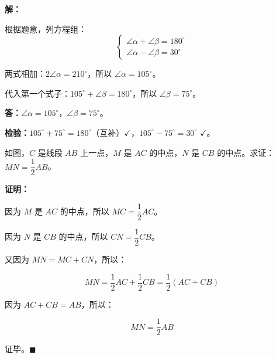 \documentclass[12pt, a4paper]{ctexart}
\begin{document}
\textbf{解：}

根据题意，列方程组：
$$\begin{cases} \angle\alpha+\angle\beta=180^\circ \\ \angle\alpha-\angle\beta=30^\circ \end{cases}$$

两式相加：$2\angle\alpha=210^\circ$，所以 $\angle\alpha=105^\circ$。

代入第一个式子：$105^\circ+\angle\beta=180^\circ$，所以 $\angle\beta=75^\circ$。

\textbf{答：}$\angle\alpha=105^\circ$，$\angle\beta=75^\circ$。

\textbf{检验：}$105^\circ+75^\circ=180^\circ$（互补）$\checkmark$，$105^\circ-75^\circ=30^\circ$ $\checkmark$。

\vspace{6pt}

\begin{examplebox}
如图，$C$ 是线段 $AB$ 上一点，$M$ 是 $AC$ 的中点，$N$ 是 $CB$ 的中点。求证：$MN=\dfrac{1}{2}AB$。

\begin{center}
\end{center}
\end{examplebox}

\textbf{证明：}

因为 $M$ 是 $AC$ 的中点，所以 $MC=\dfrac{1}{2}AC$。

因为 $N$ 是 $CB$ 的中点，所以 $CN=\dfrac{1}{2}CB$。

又因为 $MN=MC+CN$，所以：

$$MN=\frac{1}{2}AC+\frac{1}{2}CB=\frac{1}{2}(AC+CB)$$

因为 $AC+CB=AB$，所以：

$$MN=\frac{1}{2}AB$$

证毕。$\blacksquare$

\vspace{6pt}
\end{document}
